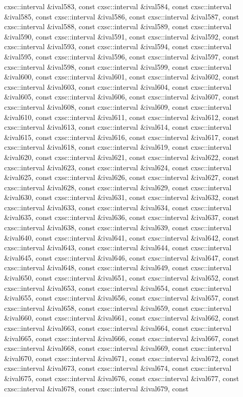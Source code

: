 \begin{DoxyCompactItemize}
cxsc\-::interval \&ival583, const cxsc\-::interval \&ival584, const cxsc\-::interval \&ival585, const cxsc\-::interval \&ival586, const cxsc\-::interval \&ival587, const cxsc\-::interval \&ival588, const cxsc\-::interval \&ival589, const cxsc\-::interval \&ival590, const cxsc\-::interval \&ival591, const cxsc\-::interval \&ival592, const cxsc\-::interval \&ival593, const cxsc\-::interval \&ival594, const cxsc\-::interval \&ival595, const cxsc\-::interval \&ival596, const cxsc\-::interval \&ival597, const cxsc\-::interval \&ival598, const cxsc\-::interval \&ival599, const cxsc\-::interval \&ival600, const cxsc\-::interval \&ival601, const cxsc\-::interval \&ival602, const cxsc\-::interval \&ival603, const cxsc\-::interval \&ival604, const cxsc\-::interval \&ival605, const cxsc\-::interval \&ival606, const cxsc\-::interval \&ival607, const cxsc\-::interval \&ival608, const cxsc\-::interval \&ival609, const cxsc\-::interval \&ival610, const cxsc\-::interval \&ival611, const cxsc\-::interval \&ival612, const cxsc\-::interval \&ival613, const cxsc\-::interval \&ival614, const cxsc\-::interval \&ival615, const cxsc\-::interval \&ival616, const cxsc\-::interval \&ival617, const cxsc\-::interval \&ival618, const cxsc\-::interval \&ival619, const cxsc\-::interval \&ival620, const cxsc\-::interval \&ival621, const cxsc\-::interval \&ival622, const cxsc\-::interval \&ival623, const cxsc\-::interval \&ival624, const cxsc\-::interval \&ival625, const cxsc\-::interval \&ival626, const cxsc\-::interval \&ival627, const cxsc\-::interval \&ival628, const cxsc\-::interval \&ival629, const cxsc\-::interval \&ival630, const cxsc\-::interval \&ival631, const cxsc\-::interval \&ival632, const cxsc\-::interval \&ival633, const cxsc\-::interval \&ival634, const cxsc\-::interval \&ival635, const cxsc\-::interval \&ival636, const cxsc\-::interval \&ival637, const cxsc\-::interval \&ival638, const cxsc\-::interval \&ival639, const cxsc\-::interval \&ival640, const cxsc\-::interval \&ival641, const cxsc\-::interval \&ival642, const cxsc\-::interval \&ival643, const cxsc\-::interval \&ival644, const cxsc\-::interval \&ival645, const cxsc\-::interval \&ival646, const cxsc\-::interval \&ival647, const cxsc\-::interval \&ival648, const cxsc\-::interval \&ival649, const cxsc\-::interval \&ival650, const cxsc\-::interval \&ival651, const cxsc\-::interval \&ival652, const cxsc\-::interval \&ival653, const cxsc\-::interval \&ival654, const cxsc\-::interval \&ival655, const cxsc\-::interval \&ival656, const cxsc\-::interval \&ival657, const cxsc\-::interval \&ival658, const cxsc\-::interval \&ival659, const cxsc\-::interval \&ival660, const cxsc\-::interval \&ival661, const cxsc\-::interval \&ival662, const cxsc\-::interval \&ival663, const cxsc\-::interval \&ival664, const cxsc\-::interval \&ival665, const cxsc\-::interval \&ival666, const cxsc\-::interval \&ival667, const cxsc\-::interval \&ival668, const cxsc\-::interval \&ival669, const cxsc\-::interval \&ival670, const cxsc\-::interval \&ival671, const cxsc\-::interval \&ival672, const cxsc\-::interval \&ival673, const cxsc\-::interval \&ival674, const cxsc\-::interval \&ival675, const cxsc\-::interval \&ival676, const cxsc\-::interval \&ival677, const cxsc\-::interval \&ival678, const cxsc\-::interval \&ival679, const 
\end{DoxyCompactItemize}
